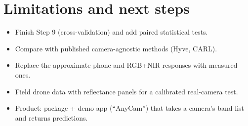\documentclass[11pt]{article}
\begin{document}
\section{Limitations and next steps}
\begin{itemize}
\item Finish Step 9 (cross-validation) and add paired statistical tests.
\item Compare with published camera-agnostic methods (Hyve, CARL).
\item Replace the approximate phone and RGB+NIR responses with measured ones.
\item Field drone data with reflectance panels for a calibrated real-camera test.
\item Product: package + demo app (``AnyCam'') that takes a camera's band list and returns predictions.
\end{itemize}
\end{document}
